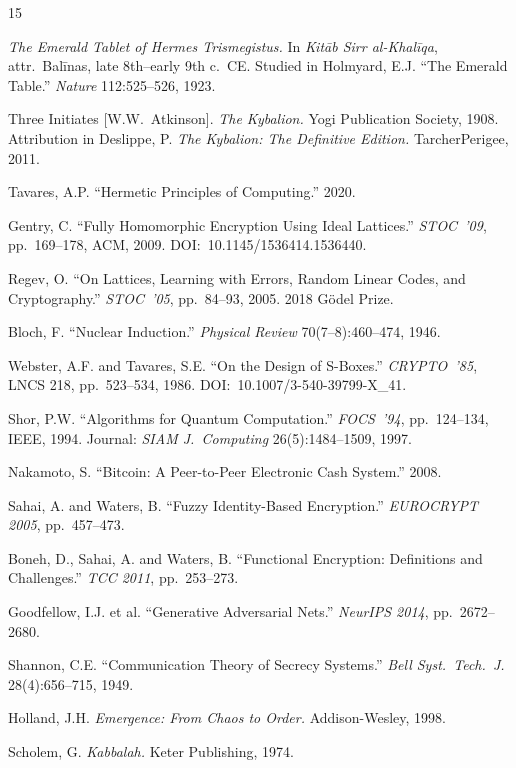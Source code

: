 \documentclass[12pt,a4paper]{article}
\begin{document}
\begin{thebibliography}{15}

\textit{The Emerald Tablet of Hermes Trismegistus.} In \textit{Kit\=ab Sirr al-Khal\=iqa}, attr.\ Bal\=inas, late 8th--early 9th c.\ CE. Studied in Holmyard, E.J. ``The Emerald Table.'' \textit{Nature} 112:525--526, 1923.

Three Initiates [W.W.\ Atkinson]. \textit{The Kybalion.} Yogi Publication Society, 1908. Attribution in Deslippe, P. \textit{The Kybalion: The Definitive Edition.} TarcherPerigee, 2011.

Tavares, A.P. ``Hermetic Principles of Computing.'' 2020.

Gentry, C. ``Fully Homomorphic Encryption Using Ideal Lattices.'' \textit{STOC~'09}, pp.~169--178, ACM, 2009. DOI:~10.1145/1536414.1536440.

Regev, O. ``On Lattices, Learning with Errors, Random Linear Codes, and Cryptography.'' \textit{STOC~'05}, pp.~84--93, 2005. 2018 G\"odel Prize.

Bloch, F. ``Nuclear Induction.'' \textit{Physical Review} 70(7--8):460--474, 1946.

Webster, A.F. and Tavares, S.E. ``On the Design of S-Boxes.'' \textit{CRYPTO~'85}, LNCS 218, pp.~523--534, 1986. DOI:~10.1007/3-540-39799-X\_41.

Shor, P.W. ``Algorithms for Quantum Computation.'' \textit{FOCS~'94}, pp.~124--134, IEEE, 1994. Journal: \textit{SIAM J.\ Computing} 26(5):1484--1509, 1997.

Nakamoto, S. ``Bitcoin: A Peer-to-Peer Electronic Cash System.'' 2008.

Sahai, A. and Waters, B. ``Fuzzy Identity-Based Encryption.'' \textit{EUROCRYPT 2005}, pp.~457--473.

Boneh, D., Sahai, A. and Waters, B. ``Functional Encryption: Definitions and Challenges.'' \textit{TCC 2011}, pp.~253--273.

Goodfellow, I.J. et al. ``Generative Adversarial Nets.'' \textit{NeurIPS 2014}, pp.~2672--2680.

Shannon, C.E. ``Communication Theory of Secrecy Systems.'' \textit{Bell Syst.\ Tech.\ J.} 28(4):656--715, 1949.

Holland, J.H. \textit{Emergence: From Chaos to Order.} Addison-Wesley, 1998.

Scholem, G. \textit{Kabbalah.} Keter Publishing, 1974.

\end{thebibliography}
\end{document}
